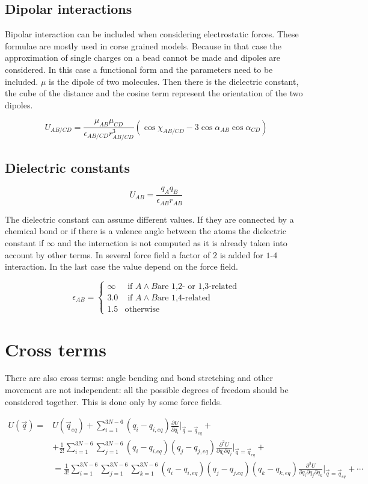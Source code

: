 	\subsection{Dipolar interactions}
	Bipolar interaction can be included when considering electrostatic forces.
	These formulae are mostly used in corse grained models.
	Because in that case the approximation of single charges on a bead cannot be made and dipoles are considered.
	In this case a functional form and the parameters need to be included.
	$\mu$ is the dipole of two molecules.
	Then there is the dielectric constant, the cube of the distance and the cosine term represent the orientation of the two dipoles.

	$$U_{AB/CD} = \frac{\mu_{AB}\mu_{CD}}{\epsilon_{AB/CD}r^3_{AB/CD}}(\cos\chi_{AB/CD}-3\cos\alpha_{AB}\cos\alpha_{CD})$$

	\subsection{Dielectric constants}

	$$U_{AB} = \frac{q_Aq_B}{\epsilon_{AB}r_{AB}}$$

	The dielectric constant can assume different values.
	If they are connected by a chemical bond or if there is a valence angle between the atoms the dielectric constant if $\infty$ and the interaction is not computed as it is already taken into account by other terms.
	In several force field a factor of $2$ is added for $1$-$4$ interaction.
	In the last case the value depend on the force field.

	$$\epsilon_{AB} = \begin{cases}\infty&\text{ if }A\land B\text{are 1,2- or 1,3-related}\\3.0&\text{ if }A\land B\text{are 1,4-related}\\1.5&\text{otherwise}\end{cases}$$

\section{Cross terms}
There are also cross terms: angle bending and bond stretching and other movement are not independent: all the possible degrees of freedom should be considered together.
This is done only by some force fields.

\begin{align*}
	U(\vec{q}) = &U(\vec{q}_{eq}) + \sum\limits_{i=1}^{3N-6}(q_i-q_{i,eq})\frac{\partial U}{\partial q_i}|_{\vec{q}=\vec{q}_{eq}} + \\
							 &+\frac{1}{2!}\sum\limits_{i=1}^{3N-6}\sum\limits_{j=1}^{3N-6}(q_i-q_{i.eq})(q_j-q_{j,eq})\frac{\partial^2 U}{\partial q_i\partial q_j}|_{\vec{q}=\vec{q}_{eq}} +\\
							 &=\frac{1}{3!}\sum\limits_{i=1}^{3N-6}\sum\limits_{j=1}^{3N-6}\sum\limits_{k=1}^{3N-6}(q_i-q_{i,eq})(q_j-q_{j.eq})(q_k-q_{k,eq})\frac{\partial^3 U}{\partial q_i\partial q_j\partial q_k}|_{\vec{q}=\vec{q}_{eq}} + \cdots
\end{align*}


